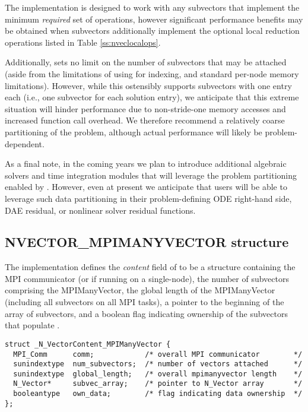 The {\nvecmpimanyvector} implementation is designed to work with any
{\nvector} subvectors that implement the minimum \emph{required} set
of operations, however significant performance benefits may be
obtained when subvectors additionally implement the optional local
reduction operations listed in Table \ref{ss:nveclocalops}.

Additionally, {\nvecmpimanyvector} sets no limit on the number of
subvectors that may be attached (aside from the limitations of using
 for indexing, and standard per-node memory
limitations).  However, while this ostensibly supports subvectors
with one entry each (i.e., one subvector for each solution entry), we
anticipate that this extreme situation will hinder performance due to
non-stride-one memory accesses and increased function call overhead.
We therefore recommend a relatively coarse partitioning of the
problem, although actual performance will likely be
problem-dependent.

As a final note, in the coming years we plan to introduce additional
algebraic solvers and time integration modules that will leverage the
problem partitioning enabled by {\nvecmpimanyvector}.  However, even at
present we anticipate that users will be able to leverage such data
partitioning in their problem-defining ODE right-hand side, DAE
residual, or nonlinear solver residual functions.


\subsection{NVECTOR\_MPIMANYVECTOR structure}
\label{ss:nvec_mpimanyvector_structure}


The {\nvecmpimanyvector} implementation defines the {\em content} field
of  to be a structure containing the MPI communicator
(or  if running on a single-node), the number of
subvectors comprising the MPIManyVector, the global length of the
MPIManyVector (including all subvectors on all MPI tasks), a pointer to
the beginning of the array of subvectors, and a boolean flag
 indicating ownership of the subvectors that populate
.
\begin{verbatim}
struct _N_VectorContent_MPIManyVector {
  MPI_Comm      comm;            /* overall MPI communicator        */
  sunindextype  num_subvectors;  /* number of vectors attached      */
  sunindextype  global_length;   /* overall mpimanyvector length    */
  N_Vector*     subvec_array;    /* pointer to N_Vector array       */
  booleantype   own_data;        /* flag indicating data ownership  */
};
\end{verbatim}

